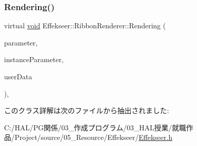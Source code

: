 \subsubsection{\texorpdfstring{Rendering()}{Rendering()}}
{\footnotesize\ttfamily virtual \mbox{\hyperlink{namespace_effekseer_ab34c4088e512200cf4c2716f168deb56}{void}} Effekseer\+::\+Ribbon\+Renderer\+::\+Rendering (\begin{DoxyParamCaption}\item[{const \mbox{\hyperlink{struct_effekseer_1_1_ribbon_renderer_1_1_node_parameter}{Node\+Parameter}} \&}]{parameter,  }\item[{const \mbox{\hyperlink{struct_effekseer_1_1_ribbon_renderer_1_1_instance_parameter}{Instance\+Parameter}} \&}]{instance\+Parameter,  }\item[{\mbox{\hyperlink{namespace_effekseer_ab34c4088e512200cf4c2716f168deb56}{void}} $\ast$}]{user\+Data }\end{DoxyParamCaption})\hspace{0.3cm}{\ttfamily [inline]}, {\ttfamily [virtual]}}



このクラス詳解は次のファイルから抽出されました\+:\begin{DoxyCompactItemize}
\item 
C\+:/\+H\+A\+L/\+P\+G関係/03\+\_\+作成プログラム/03\+\_\+\+H\+A\+L授業/就職作品/\+Project/source/05\+\_\+\+Resource/\+Effekseer/\mbox{\hyperlink{_effekseer_8h}{Effekseer.\+h}}\end{DoxyCompactItemize}
